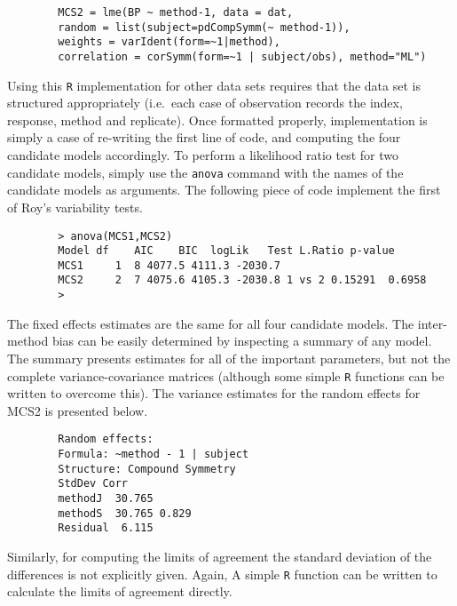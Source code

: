 \documentclass[MAIN.tex]{subfiles}
\begin{document}
	
	\begin{framed}
		\begin{verbatim}
		MCS2 = lme(BP ~ method-1, data = dat,
		random = list(subject=pdCompSymm(~ method-1)),
		weights = varIdent(form=~1|method),
		correlation = corSymm(form=~1 | subject/obs), method="ML")
		\end{verbatim}
	\end{framed}
	\vspace{1cm}
	Using this \texttt{R} implementation for other data sets requires that the data set is structured appropriately (i.e.\ each case of observation records the index, response, method and replicate). Once formatted properly, implementation is simply a case of re-writing the first line of code, and computing the four candidate models accordingly.
	\newpage
	To perform a likelihood ratio test for two candidate models, simply use the \texttt{anova} command with the names of the candidate models as arguments. The following piece of code implement the first of Roy's variability tests.
	\\
	\begin{framed}
		\begin{verbatim}
		> anova(MCS1,MCS2)
		Model df    AIC    BIC  logLik   Test L.Ratio p-value
		MCS1     1  8 4077.5 4111.3 -2030.7
		MCS2     2  7 4075.6 4105.3 -2030.8 1 vs 2 0.15291  0.6958
		>
		\end{verbatim}
	\end{framed}
	\vspace{1cm}
	The fixed effects estimates are the same for all four candidate models. The inter-method bias can be easily determined by inspecting a summary of any model. The summary presents estimates for all of the important parameters, but not the complete variance-covariance matrices (although some simple \texttt{R} functions can be written to overcome this). The variance estimates for the random effects for MCS2 is presented below.
	\\
	\begin{framed}
		\begin{verbatim}
		Random effects:
		Formula: ~method - 1 | subject
		Structure: Compound Symmetry
		StdDev Corr
		methodJ  30.765
		methodS  30.765 0.829
		Residual  6.115
		\end{verbatim}
	\end{framed}
	\vspace{1cm}
	Similarly, for computing the limits of agreement the standard deviation of the differences is not explicitly given. Again, A simple \texttt{R} function can be written to calculate the limits of agreement directly.
	
\end{document}
